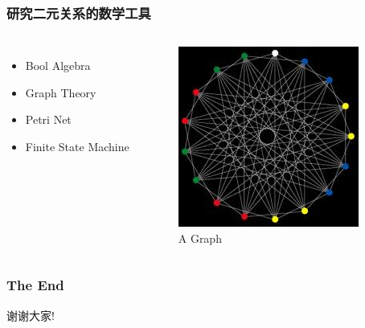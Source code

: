 \begin{frame}
  \frametitle{研究二元关系的数学工具}
  \begin{columns}
    \begin{itemize}
      \item Bool Algebra
      \item Graph Theory
      \item Petri Net
      \item Finite State Machine
    \end{itemize}
    \begin{figure}
      \centering\includegraphics[scale=.5]{images/graph.jpeg}
      \caption{A Graph}
    \end{figure}
  \end{columns}
\end{frame}

\begin{frame}
  \frametitle{The End}
  \begin{center}
    {\Huge 谢谢大家!}
  \end{center}
\end{frame}

